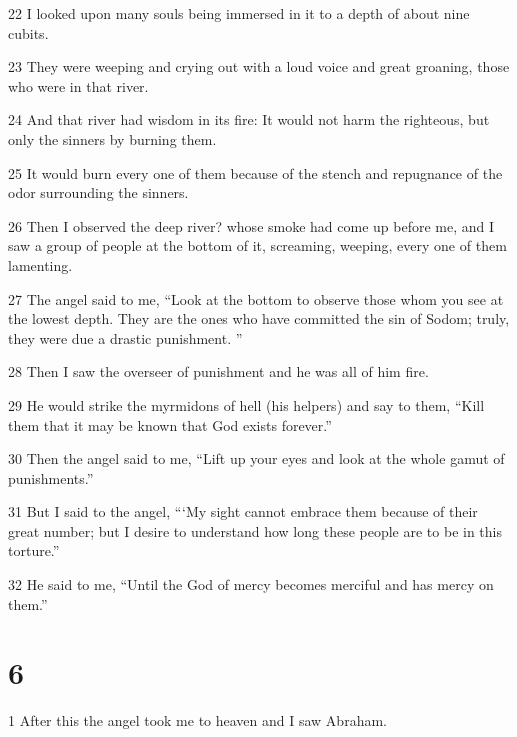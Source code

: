 \par 22 I looked upon many souls being immersed in it to a depth of about nine cubits. 

\par 23 They were weeping and crying out with a loud voice and great groaning, those who were in that river. 

\par 24 And that river had wisdom in its fire: It would not harm the righteous, but only the sinners by burning them. 

\par 25 It would burn every one of them because of the stench and repugnance of the odor surrounding the sinners. 

\par 26 Then I observed the deep river? whose smoke had come up before me, and I saw a group of people at the bottom of it, screaming, weeping, every one of them lamenting. 

\par 27 The angel said to me, “Look at the bottom to observe those whom you see at the lowest depth. They are the ones who have committed the sin of Sodom; truly, they were due a drastic punishment. ”

\par 28 Then I saw the overseer of punishment and he was all of him fire. 

\par 29 He would strike the myrmidons of hell (his helpers) and say to them, “Kill them that it may be known that God exists forever.” 

\par 30 Then the angel said to me, “Lift up your eyes and look at the whole gamut of punishments.” 

\par 31 But I said to the angel, “‘My sight cannot embrace them because of their great number; but I desire to understand how long these people are to be in this torture.” 

\par 32 He said to me, “Until the God of mercy becomes merciful and has mercy on them.”

\chapter{6}

\par 1 After this the angel took me to heaven and I saw Abraham. 

